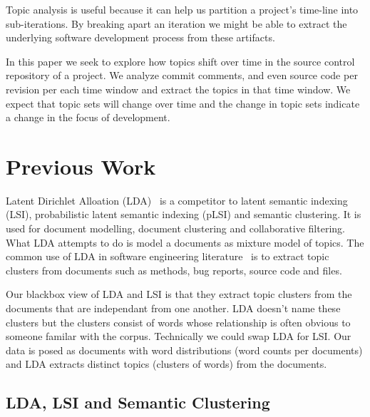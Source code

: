 \documentclass[times, 10pt,twocolumn]{article}
\begin{document}

Topic analysis is useful because it can help us partition a project's
time-line into sub-iterations. By breaking apart an iteration we might
be able to extract the underlying software development process from
these artifacts.

In this paper we seek to explore how topics shift over time in
the source control repository of a project. We analyze commit
comments, and even source code per revision per each time window and
extract the topics in that time window. We expect that topic sets
will change over time and the change in topic sets indicate a change
in the focus of development. 

\section{Previous Work}



Latent Dirichlet Alloation (LDA)~\cite{944937} is a competitor to
latent semantic indexing (LSI), probabilistic latent semantic indexing
(pLSI) and semantic clustering. It is used for document modelling,
document clustering and collaborative filtering. What LDA attempts to
do is model a documents as mixture model of topics.  The common use of
LDA in software engineering
literature~\cite{lukins2008,10.1109/MSR.2007.20,NIPS2007637,1321709}
is to extract topic clusters from documents such as methods, bug
reports, source code and files.

Our blackbox view of LDA and LSI is that they extract topic clusters
from the documents that are independant from one another. LDA doesn't
name these clusters but the clusters consist of words whose
relationship is often obvious to someone familar with the
corpus. Technically we could swap LDA for LSI. Our data is posed as
documents with word distributions (word counts per documents) and LDA
extracts distinct topics (clusters of words) from the documents.

\subsection{LDA, LSI and Semantic Clustering}
\end{document}
